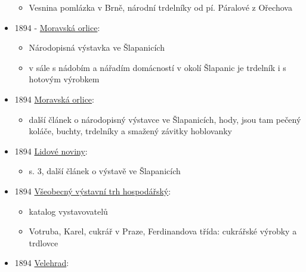 \begin{itemize}
  \begin{itemize}
  \tightlist
  \item
    Vesnina pomlázka v Brně, národní trdelníky od pí. Páralové z
    Ořechova
  \end{itemize}
\item
  1894 -
  \href{https://ndk.cz/view/uuid:04ec7ad2-32f0-11de-992b-00145e5790ea?page=uuid\%3A81b0ec10-3115-11e8-b257-005056825209&fulltext=trdeln\%C3\%ADk}{Moravská
  orlice}:

  \begin{itemize}
  \tightlist
  \item
    Národopisná výstavka ve Šlapanicích
  \item
    v sále s nádobím a nářadím domácností v okolí Šlapanic je trdelník i
    s hotovým výrobkem
  \end{itemize}
\item
  1894
  \href{https://ceskadigitalniknihovna.cz/view/uuid:04ecc8f4-32f0-11de-992b-00145e5790ea?page=uuid:2a2ac745-32f0-11de-992b-00145e5790ea&fulltext=trdeln\%C3\%AD*&source=mzk}{Moravská
  orlice}:

  \begin{itemize}
  \tightlist
  \item
    další článek o národopisný výstavce ve Šlapanicích, hody, jsou tam
    pečený koláče, buchty, trdelníky a smažený závitky hoblovanky
  \end{itemize}
\item
  1894
  \href{https://ceskadigitalniknihovna.cz/uuid/uuid:b8222e44-435d-11dd-b505-00145e5790ea}{Lidové
  noviny}:

  \begin{itemize}
  \tightlist
  \item
    s. 3, další článek o výstavě ve Šlapanicích
  \end{itemize}
\item
  1894
  \href{https://ndk.cz/uuid/uuid:ab9cd010-b908-11dc-83b0-000d606f5dc6}{Všeobecný
  výstavní trh hospodářský}:

  \begin{itemize}
  \tightlist
  \item
    katalog vystavovatelů
  \item
    Votruba, Karel, cukrář v Praze, Ferdinandova třída: cukrářské
    výrobky a trdlovce
  \end{itemize}
\item
  1894
  \href{https://ceskadigitalniknihovna.cz/uuid/uuid:c041b7c0-a37f-11de-95bf-000d606f5dc6}{Velehrad}:


\end{itemize}
